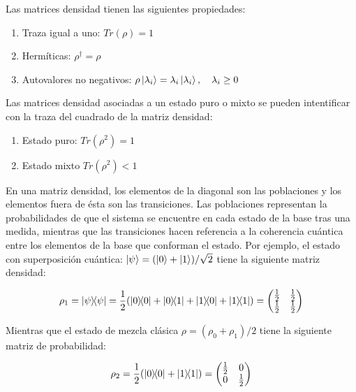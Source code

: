 Las matrices densidad tienen las siguientes propiedades:

\begin{enumerate}
    \item Traza igual a uno: $Tr(\rho) = 1$
    \item Hermíticas: $\rho^\dagger = \rho$
    \item Autovalores no negativos: $\rho \ket{\lambda_i} = \lambda_i \ket{\lambda_i}, \quad \lambda_i \geq 0$
\end{enumerate}

Las matrices densidad asociadas a un estado puro o mixto se pueden intentificar con la traza del cuadrado de la matriz densidad:

\begin{enumerate}
    \item Estado puro: $Tr(\rho^2) = 1$
    \item Estado mixto $Tr(\rho^2) < 1$
\end{enumerate}

En una matriz densidad, los elementos de la diagonal son las poblaciones y los elementos fuera de ésta son las transiciones. Las poblaciones representan la probabilidades de que el sistema se encuentre en cada estado de la base tras una medida, mientras que las transiciones hacen referencia a la coherencia cuántica entre los elementos de la base que conforman el estado. Por ejemplo, el estado con superposición cuántica: $\ket{\psi} = (\ket{0} + \ket{1})/\sqrt{2}$ tiene la siguiente matriz densidad:

\begin{equation}
    \rho_1 = \ketbra{\psi}{\psi} = \frac{1}{2} (\ketbra{0}{0} + \ketbra{0}{1} + \ketbra{1}{0} + \ketbra{1}{1}) =
    \begin{pmatrix}
        \frac{1}{2} & \frac{1}{2} \\
        \frac{1}{2} & \frac{1}{2}
    \end{pmatrix}
\end{equation}

Mientras que el estado de mezcla clásica $\rho = (\rho_0 + \rho_1)/2$ tiene la siguiente matriz de probabilidad:

\begin{equation}
    \rho_2 = \frac{1}{2} (\ketbra{0}{0} + \ketbra{1}{1}) =
    \begin{pmatrix}
        \frac{1}{2} & 0 \\
        0 & \frac{1}{2}
    \end{pmatrix}
\end{equation}

